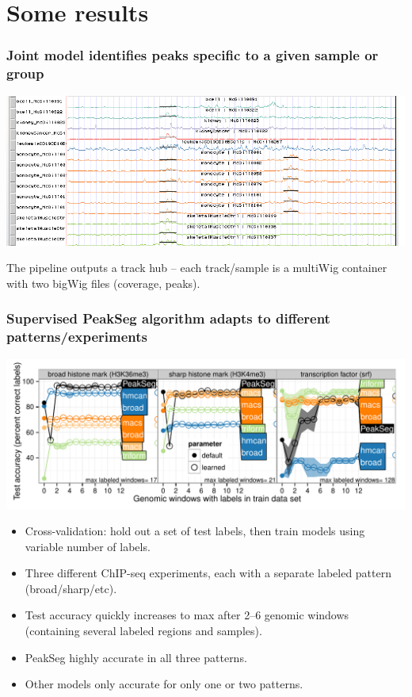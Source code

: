 \documentclass{beamer}
\begin{document}
\section{Some results}

\begin{frame}
  \frametitle{Joint model identifies peaks specific to a given sample or group}

  \includegraphics[width=\textwidth]{PeakSegJoint-monocytes-up}

  The pipeline outputs a track hub -- each track/sample is a multiWig
  container with two bigWig files (coverage, peaks).

\end{frame}

\begin{frame}
  \frametitle{Supervised PeakSeg algorithm adapts to different
    patterns/experiments}

\includegraphics[width=\textwidth]{figure-test-error-decreases-mean}
  
  \begin{itemize}
  \item Cross-validation: hold out a set of test labels, then train
    models using variable number of labels.
  \item Three different ChIP-seq experiments, each with a separate
    labeled pattern (broad/sharp/etc).
  \item Test accuracy quickly increases to max after 2--6
    genomic windows (containing several labeled regions and samples).
  \item PeakSeg highly accurate in all three patterns.
  \item Other models only accurate for only one or two patterns.
  \end{itemize}
\end{frame}
\end{document}
